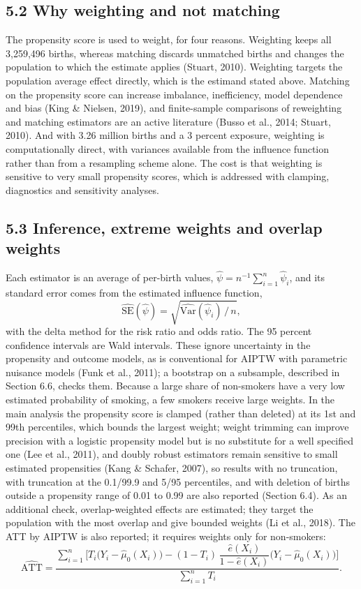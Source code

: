 \documentclass[11pt,letterpaper]{article}
\begin{document}
\subsection*{5.2 Why weighting and not matching}

The propensity score is used to weight, for four reasons. Weighting keeps all 3,259,496 births, whereas matching discards unmatched births and changes the population to which the estimate applies (Stuart, 2010). Weighting targets the population average effect directly, which is the estimand stated above. Matching on the propensity score can increase imbalance, inefficiency, model dependence and bias (King \& Nielsen, 2019), and finite-sample comparisons of reweighting and matching estimators are an active literature (Busso et al., 2014; Stuart, 2010). And with 3.26 million births and a 3 percent exposure, weighting is computationally direct, with variances available from the influence function rather than from a resampling scheme alone. The cost is that weighting is sensitive to very small propensity scores, which is addressed with clamping, diagnostics and sensitivity analyses.

\subsection*{5.3 Inference, extreme weights and overlap weights}

Each estimator is an average of per-birth values, $\hat\psi = n^{-1}\sum_{i=1}^{n}\hat\psi_i$, and its standard error comes from the estimated influence function,
\begin{equation}
\widehat{\mathrm{SE}}(\hat\psi) = \sqrt{\widehat{\mathrm{Var}}(\hat\psi_i)\,/\,n},
\end{equation}
with the delta method for the risk ratio and odds ratio. The 95 percent confidence intervals are Wald intervals. These ignore uncertainty in the propensity and outcome models, as is conventional for AIPTW with parametric nuisance models (Funk et al., 2011); a bootstrap on a subsample, described in Section 6.6, checks them. Because a large share of non-smokers have a very low estimated probability of smoking, a few smokers receive large weights. In the main analysis the propensity score is clamped (rather than deleted) at its 1st and 99th percentiles, which bounds the largest weight; weight trimming can improve precision with a logistic propensity model but is no substitute for a well specified one (Lee et al., 2011), and doubly robust estimators remain sensitive to small estimated propensities (Kang \& Schafer, 2007), so results with no truncation, with truncation at the 0.1/99.9 and 5/95 percentiles, and with deletion of births outside a propensity range of 0.01 to 0.99 are also reported (Section 6.4). As an additional check, overlap-weighted effects are estimated; they target the population with the most overlap and give bounded weights (Li et al., 2018). The ATT by AIPTW is also reported; it requires weights only for non-smokers:
\begin{equation}
\widehat{\mathrm{ATT}} = \frac{\sum_{i=1}^{n}\Big[T_i\big(Y_i-\hat\mu_0(X_i)\big) - (1-T_i)\,\dfrac{\hat e(X_i)}{1-\hat e(X_i)}\big(Y_i-\hat\mu_0(X_i)\big)\Big]}{\sum_{i=1}^{n}T_i}.
\end{equation}
\end{document}
